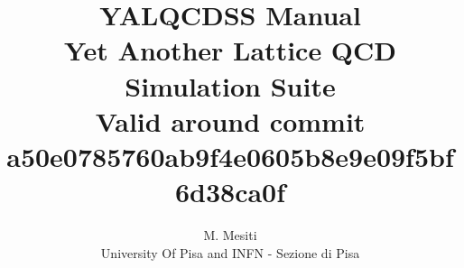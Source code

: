 \documentclass[a4paper,10pt]{scrartcl}
\title{{\Huge \bf YALQCDSS Manual} \\
Yet Another Lattice QCD Simulation Suite \\
{\small Valid around commit 
a50e0785760ab9f4e0605b8e9e09f5bf6d38ca0f
}}
\author{M. Mesiti\\{\small University Of Pisa and INFN - Sezione di Pisa}}
\begin{document}
\maketitle
\date{}
 

  

  
 
  
  
%  
\end{document}
